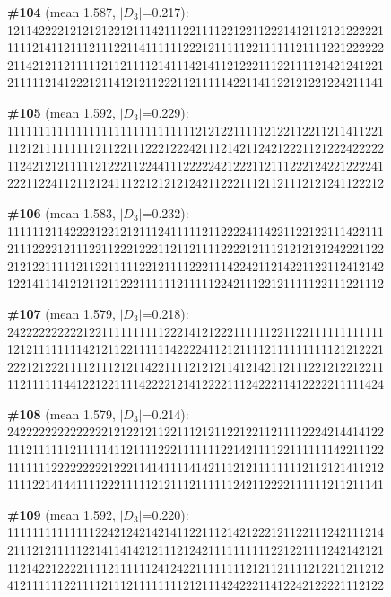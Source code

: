 \documentclass[10pt]{article}
\begin{document}
\noindent\textbf{\#104} (mean 1.587, $|D_3|$=0.217):\\
121142222121212122121114211122111122122112221412112121222221\\
111121411211121112211411111122212111112211111121111221222222\\
211421211211111211211112141114214112122211122111121421241221\\
211111214122212114121211222112111114221141122121221224211141\medskip

\noindent\textbf{\#105} (mean 1.592, $|D_3|$=0.229):\\
111111111111111111111111111111212122111112122112211211411221\\
112121111111112112211122212224211121421124212221121222422222\\
112421212111112122211224411122222421222112111222124221222241\\
222112241121121241112212121212421122211121121112121241122212\medskip

\noindent\textbf{\#106} (mean 1.583, $|D_3|$=0.232):\\
111111211422221221212111241111121122224114221122122111422111\\
211122221211122112221222112112111122221211121212121242221122\\
212122111112112211111221211112221114224211214221122112412142\\
122141114121211211222111111211111224211122121111122111221112\medskip

\noindent\textbf{\#107} (mean 1.579, $|D_3|$=0.218):\\
242222222222122111111111122214121222111111221122111111111111\\
121211111111421211221111114222241121211112111111111121212221\\
222121222111121112121142211112121211412142112111221212212211\\
112111111441221221111422221214122221112422211412222211111424\medskip

\noindent\textbf{\#108} (mean 1.579, $|D_3|$=0.214):\\
242222222222222212122121122111212112212211211112224214414122\\
111211111121111141121111222111111122142111122111111142211122\\
111111122222222212221141411114142111212111111112112121411212\\
111122141441111222111112121112111111242112222111111211211141\medskip

\noindent\textbf{\#109} (mean 1.592, $|D_3|$=0.220):\\
111111111111112242124214214112211121421222121122111242111214\\
211121211111221411414212111212421111111111221221111242142121\\
112142212222111121111112412422111111112121121111212211211212\\
412111111221111211121111111121211142422211412242122221112122\medskip
\end{document}
